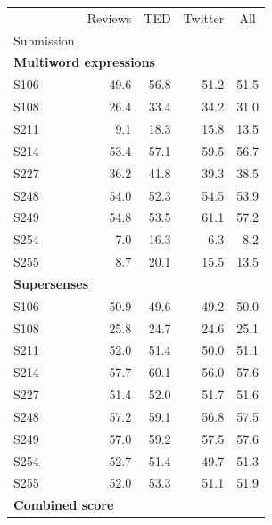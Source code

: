 \documentclass[11pt,letterpaper]{article}
\begin{document}
\begin{table}\small\centering
\begin{tabular}{lrrrr}
\toprule
{} &  Reviews &   \multicolumn{1}{c}{TED} &  Twitter &  \multicolumn{1}{c}{All} \\
Submission &          &       &          &             \\
\midrule
\multicolumn{5}{l}{\textbf{Multiword expressions}} \\

S106        &    49.6 & 56.8 &    51.2 &       51.5 \\
S108        &    26.4 & 33.4 &    34.2 &       31.0 \\
S211        &     9.1 & 18.3 &    15.8 &       13.5 \\
S214        &    53.4 & 57.1 &    59.5 &       56.7 \\
S227        &    36.2 & 41.8 &    39.3 &       38.5 \\
S248        &    54.0 & 52.3 &    54.5 &       53.9 \\
S249        &    54.8 & 53.5 &    61.1 &       57.2 \\
S254        &     7.0 & 16.3 &     6.3 &        8.2 \\
S255        &     8.7 & 20.1 &    15.5 &       13.5 \\[1.4ex]

\multicolumn{5}{l}{\textbf{Supersenses}} \\

S106        &    50.9 & 49.6 &    49.2 &       50.0 \\
S108        &    25.8 & 24.7 &    24.6 &       25.1 \\
S211        &    52.0 & 51.4 &    50.0 &       51.1 \\
S214        &    57.7 & 60.1 &    56.0 &       57.6 \\
S227        &    51.4 & 52.0 &    51.7 &       51.6 \\
S248        &    57.2 & 59.1 &    56.8 &       57.5 \\
S249        &    57.0 & 59.2 &    57.5 &       57.6 \\
S254        &    52.7 & 51.4 &    49.7 &       51.3 \\
S255        &    52.0 & 53.3 &    51.1 &       51.9 \\[1.4ex]

\multicolumn{5}{l}{\textbf{Combined score}} \\


\end{tabular}
\end{table}
\end{document}
